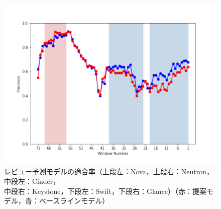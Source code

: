 \documentclass[submit]{ipsj}
\begin{document}
\begin{figure}[t]
\begin{minipage}[b]{0.65\columnwidth}
    \includegraphics[width=1\columnwidth]{Uenaka_fig/RQ2_result/Glance/Glance_review_Precision.pdf}
\end{minipage}
    \caption{レビュー予測モデルの適合率（上段左：Nova，上段右：Neutron，中段左：Cinder，\\ 中段右：Keystone，下段左：Swift，下段右：Glance）（赤：提案モデル，青：ベースラインモデル）}
    \label{fig:review_p}
\end{figure}

\end{document}

